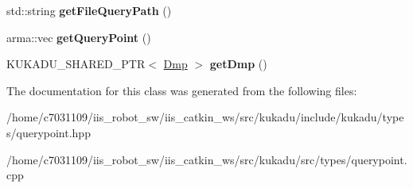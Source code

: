 \begin{DoxyCompactItemize}
\item 
\hypertarget{classkukadu_1_1QueryPoint_a89324d5514596508eb423e47fc7c5eb4}{std\-::string {\bfseries get\-File\-Query\-Path} ()}\label{classkukadu_1_1QueryPoint_a89324d5514596508eb423e47fc7c5eb4}

\item 
\hypertarget{classkukadu_1_1QueryPoint_a532d7a36ed8e43f9a5cec52f05a0170a}{arma\-::vec {\bfseries get\-Query\-Point} ()}\label{classkukadu_1_1QueryPoint_a532d7a36ed8e43f9a5cec52f05a0170a}

\item 
\hypertarget{classkukadu_1_1QueryPoint_a153252510a2083463caf5ce2cbcfeb5f}{K\-U\-K\-A\-D\-U\-\_\-\-S\-H\-A\-R\-E\-D\-\_\-\-P\-T\-R$<$ \hyperlink{classkukadu_1_1Dmp}{Dmp} $>$ {\bfseries get\-Dmp} ()}\label{classkukadu_1_1QueryPoint_a153252510a2083463caf5ce2cbcfeb5f}

\end{DoxyCompactItemize}


The documentation for this class was generated from the following files\-:\begin{DoxyCompactItemize}
\item 
/home/c7031109/iis\-\_\-robot\-\_\-sw/iis\-\_\-catkin\-\_\-ws/src/kukadu/include/kukadu/types/querypoint.\-hpp\item 
/home/c7031109/iis\-\_\-robot\-\_\-sw/iis\-\_\-catkin\-\_\-ws/src/kukadu/src/types/querypoint.\-cpp\end{DoxyCompactItemize}
